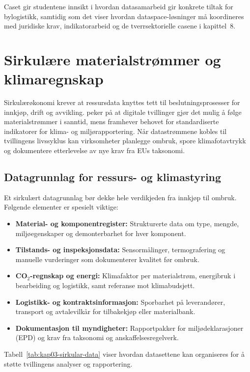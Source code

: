 Caset gir studentene innsikt i hvordan datasamarbeid gir konkrete tiltak for bylogistikk, samtidig som det viser hvordan
dataspace-løsninger må koordineres med juridiske krav, indikatorarbeid og de tverrsektorielle casene i kapittel~8.

\section{Sirkulære materialstrømmer og klimaregnskap}
Sirkulærøkonomi krever at ressursdata knyttes tett til beslutningsprosesser for innkjøp, drift og avvikling. \citet{norskindustri2023sirkular}
peker på at digitale tvillinger gjør det mulig å følge materialstrømmer i sanntid, mens \citet{miljodir2023materialstrommer} framhever
behovet for standardiserte indikatorer for klima- og miljørapportering. Når datastrømmene kobles til tvillingens livssyklus kan
virksomheter planlegge ombruk, spore klimafotavtrykk og dokumentere etterlevelse av nye krav fra EUs taksonomi.

\subsection{Datagrunnlag for ressurs- og klimastyring}
Et sirkulært datagrunnlag bør dekke hele verdikjeden fra innkjøp til ombruk. Følgende elementer er spesielt viktige:
\begin{itemize}
    \item \textbf{Material- og komponentregister:} Strukturerte data om type, mengde, miljøegenskaper og demonterbarhet for hver komponent.
    \item \textbf{Tilstands- og inspeksjonsdata:} Sensormålinger, termografering og manuelle vurderinger som dokumenterer kvalitet før ombruk.
    \item \textbf{CO$_2$-regnskap og energi:} Klimafaktor per materialstrøm, energibruk i bearbeiding og logistikk, samt referanse mot klimabudsjett.
    \item \textbf{Logistikk- og kontraktsinformasjon:} Sporbarhet på leverandører, transport og avtalevilkår for tilbakekjøp eller materialbank.
    \item \textbf{Dokumentasjon til myndigheter:} Rapportpakker for miljødeklarasjoner (EPD) og krav fra taksonomi og anskaffelsesregelverk.
\end{itemize}

Tabell~\ref{tab:kap03-sirkular-data} viser hvordan datasettene kan organiseres for å støtte tvillingens analyser og rapportering.

